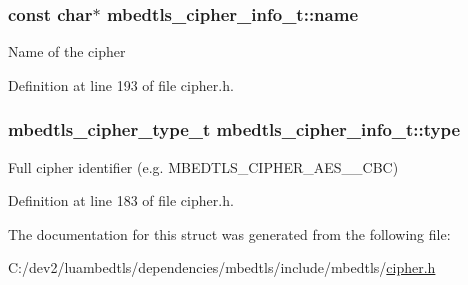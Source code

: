 \hypertarget{structmbedtls__cipher__info__t_a7e79a9fb2bd143cc08d59b89b86c9ed7}{
\subsubsection[{name}]{\setlength{\rightskip}{0pt plus 5cm}const char$\ast$ mbedtls\-\_\-cipher\-\_\-info\-\_\-t\-::name}}\label{structmbedtls__cipher__info__t_a7e79a9fb2bd143cc08d59b89b86c9ed7}
Name of the cipher 

Definition at line 193 of file cipher.\-h.

\hypertarget{structmbedtls__cipher__info__t_a399f289efa81ca0da63bc80686b5fe82}{
\subsubsection[{type}]{\setlength{\rightskip}{0pt plus 5cm}mbedtls\-\_\-cipher\-\_\-type\-\_\-t mbedtls\-\_\-cipher\-\_\-info\-\_\-t\-::type}}\label{structmbedtls__cipher__info__t_a399f289efa81ca0da63bc80686b5fe82}
Full cipher identifier (e.\-g. M\-B\-E\-D\-T\-L\-S\-\_\-\-C\-I\-P\-H\-E\-R\-\_\-\-A\-E\-S\-\_\-\_\-\-C\-B\-C) 

Definition at line 183 of file cipher.\-h.



The documentation for this struct was generated from the following file\-:\begin{DoxyCompactItemize}
\item 
C\-:/dev2/luambedtls/dependencies/mbedtls/include/mbedtls/\hyperlink{cipher_8h}{cipher.\-h}\end{DoxyCompactItemize}
